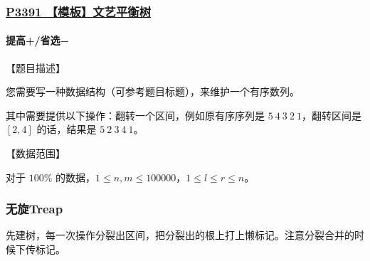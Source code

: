 \documentclass[utf8]{ctexbeamer}
\begin{document}
    \begin{frame}
        \frametitle{\href{https://www.luogu.com.cn/problem/P3391}{P3391 【模板】文艺平衡树}}
        \framesubtitle{\textcolor[RGB]{52, 152, 219}{提高+/省选−}}        
        【题目描述】

        您需要写一种数据结构（可参考题目标题），来维护一个有序数列。  

        其中需要提供以下操作：翻转一个区间，例如原有序序列是 $5\ 4\ 3\ 2\ 1$，翻转区间是 $[2,4]$ 的话，结果是 $5\ 2\ 3\ 4\ 1$。

        【数据范围】  

        对于 $100\%$ 的数据，$1 \le n, m \leq 100000 $，$1 \le l \le r \le n$。
    \end{frame}

    \begin{frame}
        \frametitle{无旋Treap}
        先建树，每一次操作分裂出区间，把分裂出的根上打上懒标记。注意分裂合并的时候下传标记。    
    \end{frame}
\end{document}
